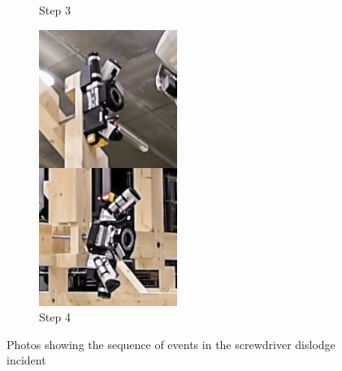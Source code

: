 \begin{figure}[!h]
\begin{subfigure}[b]{0.24\textwidth}
        \caption*{Step 3}%
    \end{subfigure}
    \hfill
    \begin{subfigure}[b]{0.24\textwidth}
        \centering
        \includegraphics[width=\textwidth]{images/7b/img89.jpg}
        \caption*{Step 4}%
    \end{subfigure}

    \caption{Photos showing the sequence of events in the screwdriver dislodge incident}
    \label{fig:sequence-of-events-dislodge-incident}
\end{figure}

